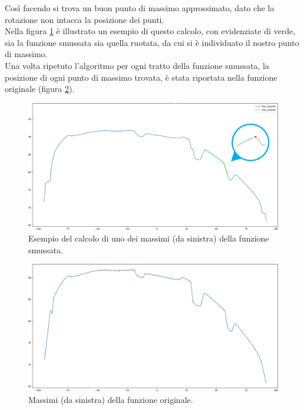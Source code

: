 \noindent Così facendo si trova un buon punto di massimo approssimato, dato che la rotazione non intacca la posizione dei punti.\\
\newline
Nella figura \ref{fig:batt_2_analisi_8} è illustrato un esempio di questo calcolo, con evidenziate di verde, sia la funzione smussata sia quella ruotata, da cui si è individuato il nostro punto di massimo.\\
\newline
Una volta ripetuto l'algoritmo per ogni tratto della funzione smussata, la posizione di ogni punto di massimo trovata, è stata riportata nella funzione originale (figura \ref{fig:batt_2_analisi_9}).\\

\begin{figure}[H]
	\centering
	\includegraphics[width=0.9\columnwidth]{./pictures/batt_2_analisi_8.png}
	\caption{Esempio del calcolo di uno dei massimi (da sinistra) della funzione smussata.}\label{fig:batt_2_analisi_8}
\end{figure}

\begin{figure}[H]
	\centering
	\includegraphics[width=0.9\columnwidth]{./pictures/batt_2_analisi_9.png}
	\caption{Massimi (da sinistra) della funzione originale.}\label{fig:batt_2_analisi_9}
\end{figure}

